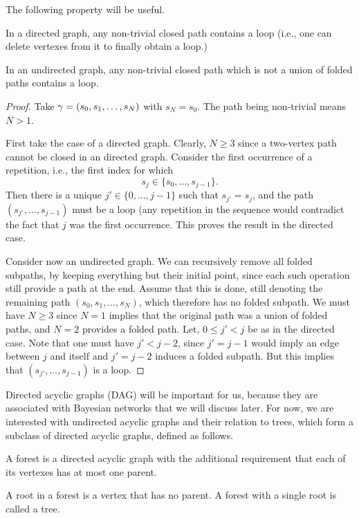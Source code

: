 The following property will be useful.
\begin{proposition}
\label{prop:loop}
In a directed graph, any non-trivial closed path 
 contains a loop (i.e., one
can delete vertexes from it to finally obtain a loop.)

In an undirected graph, any non-trivial  closed path which is not a union of folded paths contains a loop.
\end{proposition}
\begin{proof}
Take $\gamma = (s_0, s_1,
\ldots, s_{N})$ with $s_N=s_0$. The path being non-trivial means $N> 1$.

First take the case of a directed graph. Clearly, $N\geq 3$ since a two-vertex path cannot be closed in an directed graph. Consider the first
occurrence of a repetition, i.e., the first index for which 
\[
s_j\in \{s_0, \ldots, s_{j-1}\}.
\]
Then there is a unique $j'\in \{0, \ldots, j-1\}$ such that $s_{j'} = s_j$, and the path $(s_{j'},
\ldots, s_{j-1})$ must be a loop (any repetition in the sequence would contradict the fact that $j$ was the first occurrence. This proves the result in the directed case.

Consider now an undirected graph. We can recursively remove all folded subpaths, by keeping everything but their initial point, since each such operation still provide a path at the end. Assume that this is done, still denoting the  remaining path $(s_0, s_1, \ldots, s_{N})$, which therefore has no folded subpath. We must have $N\geq 3$ since $N=1$ implies that the original path was a union of folded paths, and $N=2$ provides a folded path. 
Let, $0\leq j' < j$ be as in the directed case. Note that one must have $j' < j-2$, since $j'=j-1$ would imply an edge between $j$ and itself and $j'=j-2$ induces a folded subpath. But this implies that  $(s_{j'},
\ldots, s_{j-1})$ is a loop. 
\end{proof}


 
Directed acyclic graphs (DAG) will be important for us, because they
are associated with Bayesian networks that we will discuss later. For now, we are
interested with undirected acyclic graphs and their relation to
trees, which form a
subclass of directed acyclic graphs, defined as follows.
\begin{definition}
\label{def:tree}
A forest is a directed acyclic graph with the additional
requirement that each of its vertexes has at most one parent. 


A root in a forest is a vertex that has no parent. A
forest with a single root is called a tree.
\end{definition}


